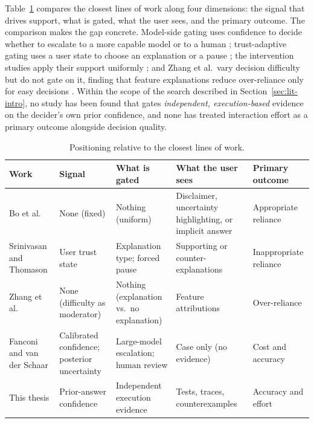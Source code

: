 \documentclass[oneside,final,14pt,a4paper]{extreport}
\begin{document}
Table~\ref{tab:positioning} compares the closest lines of work along four
dimensions: the signal that drives support, what is gated, what the user sees,
and the primary outcome. The comparison makes the gap concrete. Model-side
gating uses confidence to decide whether to escalate to a more capable model or
to a human \cite{CascadedLM2025}; trust-adaptive gating uses a user state to
choose an explanation or a pause \cite{SrinivasanAdjustForTrust}; the
intervention studies apply their support uniformly \cite{Bo2025}; and Zhang et
al.\ vary decision difficulty but do not gate on it, finding that feature
explanations reduce over-reliance only for easy decisions
\cite{Zhang2024Verify}. Within the scope of the search described in
Section~\ref{sec:lit-intro}, no study has been found that gates \emph{independent,
execution-based} evidence on the decider's own prior confidence, and none has
treated interaction effort as a primary outcome alongside decision quality.

\begin{table}[t]
\centering
\caption{Positioning relative to the closest lines of work.}
\label{tab:positioning}
\footnotesize
\begin{tabular}{@{}>{\raggedright\arraybackslash}p{2.4cm}>{\raggedright\arraybackslash}p{2.0cm}>{\raggedright\arraybackslash}p{2.6cm}>{\raggedright\arraybackslash}p{3.2cm}>{\raggedright\arraybackslash}p{2.6cm}@{}}
\toprule
Work & Signal & What is gated & What the user sees & Primary outcome \\
\midrule
Bo et al. \cite{Bo2025} & None (fixed) & Nothing (uniform) & Disclaimer, uncertainty highlighting, or implicit answer & Appropriate reliance \\
Srinivasan and Thomason \cite{SrinivasanAdjustForTrust} & User trust state & Explanation type; forced pause & Supporting or counter-explanations & Inappropriate reliance \\
Zhang et al. \cite{Zhang2024Verify} & None (difficulty as moderator) & Nothing (explanation vs.\ no explanation) & Feature attributions & Over-reliance \\
Fanconi and van der Schaar \cite{CascadedLM2025} & Calibrated confidence; posterior uncertainty & Large-model escalation; human review & Case only (no evidence) & Cost and accuracy \\
This thesis & Prior-answer confidence & Independent execution evidence & Tests, traces, counterexamples & Accuracy and effort \\
\bottomrule
\end{tabular}
\end{table}
\end{document}
